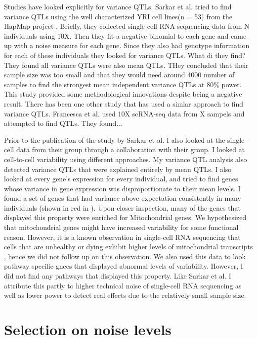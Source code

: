Studies have looked explicitly for variance QTLs. Sarkar et al. tried to find variance QTLs using the well characterized YRI cell lines(n = 53) from the HapMap project \cite{hapmap}. Briefly, they collected single-cell RNA-sequencing data from N individuals using 10X. Then they fit a negative binomial to each gene and came up with a noise measure for each gene. Since they also had genotype information for each of these individuals they looked for variance QTLs. What di they find? They found all variance QTLs were also mean QTLs. THey concluded that their sample size was too small and that they would need around 4000 number of samples to find the strongest mean independent variance QTLs at 80\% power. This study provided some methodological innovations despite being a negative result. There has been one other study that has used a simlar approach to find variance QTLs. Francesca et al. used 10X scRNA-seq data from X sampels and attempted to find QTLs. They found...

Prior to the publication of the study by Sarkar et al. I also looked at the single-cell data from their group through a collaboration with their group. I looked at cell-to-cell variability using different approaches. My variance QTL analysis also detected variance QTLs that were explained entirely by mean QTLs. I also looked at every gene's expression for every individual, and tried to find genes whose variance in gene expression was disproportionate to their mean levels. I found a set of genes that had variance above expectation consistently in many individuals (shown in red in ). Upon closer inspection, many of the genes that displayed this property were enriched for Mitochondrial genes. We hypothesized that mitochondrial genes might have increased variability for some functional reason. However, it is a known observation in single-cell RNA sequencing that cells that are unhealthy or dying exhibit higher levels of mitochondrial transcripts \cite {seurat}, hence we did not follow up on this observation. We also used this data to look pathway specific gnees that displayed abnormal levels of variability. However, I did not find any pathways that displayed this property. Like Sarkar et al. I attribute this partly to higher technical noise of single-cell RNA sequencing as well as lower power to detect real effects due to the relatively small sample size.

\section{Selection on noise levels}

